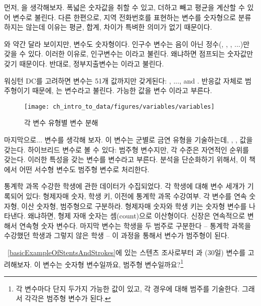 먼저, 을 생각해보자. 폭넓은 숫자값을 취할 수 있고, 더하고 빼고 평균을 계산할 수 있어  변수로 불린다. 다른 한편으로, 지역 전화번호를 표현하는 변수를 숫자형으로 분류하지는 않는데 이유는 평균, 합계, 차이가 특벼한 의미가 없기 때문이다.

와 약간 달라 보이지만,  변수도 숫자형이다. 
인구수 변수는 음이 아닌 정수(, , , ...)만 갖을 수 있다. 
이러한 이유로, 인구변수는 이라고 불린다. 왜냐하면 점프되는 숫자값만 갖기 때문이다.
반대로, 정부지출변수는 이라고 불린다.

워싱턴 DC를 고려하면  변수는 51개 값까지만 갖게된다: , ..., and .
반응값 자체로 범주형이기 때문에, 는  변수라고 불린다.
가능한 값을 변수 이라고 부른다.

\begin{figure}
\centering
\texttt{[image: ch\_intro\_to\_data/figures/variables/variables]}
\caption{각 변수 유형별 변수 분해}
\label{variables}
\end{figure}


마지막으로...  변수를 생각해 보자.
이 변수는 군별로 금연 유형을 기술하는데, , ,  값을 갖는다. 하이브리드 변수로 볼 수 있다: 범주형 변수지만, 각 수준은 자연적인 순위를 갖는다.
이러한 특성을 갖는 변수를  변수라고 부른다.
분석을 단순화하기 위해서, 이 책에서 어떤 서수형 변수도 범주형 변수로 처리한다.


\begin{example}{통계학 과목 수강한 학생에 관한 데이터가 수집되었다. 각 학생에 대해 변수 세개가 기록되어 있다: 형제자매 숫자, 학생 키, 이전에 통계학 과목 수강여부. 각 변수를 연속 숫자형, 이산 숫자형, 범주형으로 구분하라.}
형제자매 숫자와 학생 키는 숫자형 변수를 나타낸다.
왜냐하면, 형제 자매 숫자는 셈(count)으로 이산형이다. 신장은 연속적으로 변해서 연속형 숫자 변수다.
마지막 변수는 학생을 두 범주로 구분한다 -- 통계학 과목을 수강했던 학생과 그렇지 않은 학생 -- 이 과정을 통해서 변수가 범주형이 된다.
\end{example}

\begin{exercise} 
~\ref{basicExampleOfStentsAndStrokes}에 있는 스텐츠 조사로부터   과 (30일)  변수를 고려해보자.
이 변수는 숫자형 변수일까요, 범주형 변수일까요?\footnote{각 변수마다 단지 두가지 가능한 값이 있고,
각 경우에 대해 범주를 기술한다. 그래서 각각은 범주형 변수가 된다.}
\end{exercise}

